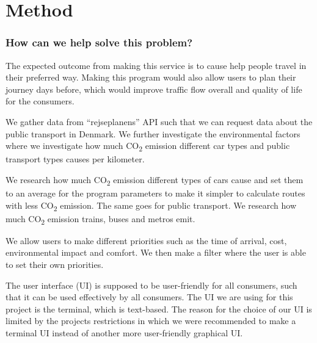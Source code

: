 \chapter{Method}\label{ch:method}

\subsection{How can we help solve this problem?}\label{subsec:how-can-we-help-solve-this-problem?}

The expected outcome from making this service is to cause help people travel in their preferred way.
Making this program would also allow users to plan their journey days before, which would improve traffic flow
overall and quality of life for the consumers.

We gather data from ``rejseplanens'' API such that we can request data about the public transport in Denmark.
We further investigate the environmental factors where we investigate how much \unit{CO_{2}} emission
different car types and public transport types causes per kilometer.

We research how much \unit{CO_{2}} emission different types of cars cause and set them to an average for
the program parameters to make it simpler to calculate routes with less \unit{CO_{2}} emission.
The same goes for public transport. We research how much \unit{CO_{2}} emission trains, buses and
metros emit.

We allow users to make different priorities such as the time of arrival, cost, environmental impact and comfort.
We then make a filter where the user is able to set their own priorities.

The user interface (UI) is supposed to be user-friendly for all consumers, such that it can be used effectively by all
consumers.
The UI we are using for this project is the terminal, which is text-based.
The reason for the choice of our UI is limited by the projects restrictions in which we were recommended to make a
terminal UI instead of another more user-friendly graphical UI.
